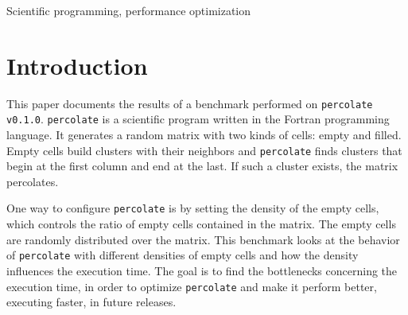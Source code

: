 \documentclass[twoside,11pt]{article}
\title{\titl}
\author{}
\def\perc{\texttt{perco\-late}}
\def\v{\texttt{v0.1.0}}
\begin{document}
\maketitle

\begin{abstract}
  \perc{} \v{} is a scientific program.
  It generates a random matrix with two kinds of cells:
  empty and filled.
  Empty cells build clusters with their neighbors and
  \perc{} finds clusters that begin at the first column and
  end at the last.
  If such a cluster exists, the matrix percolates.

  The benchmark of \perc{}---presented in this
  paper---looks at how the program scales with different
  densities of filled cells.
  The goal of this benchmark is to find bottlenecks of
  the execution time, in order to optimize \perc{} in
  future releases.

  The benchmark was executed on the Cirrus supercomputer
  with exclusive access to one back end node.
  The results of the benchmark show extreme and unresolved
  scaling behavior over the different densities of empty
  cells, but successfully exposes the bottleneck.

  This paper discusses the results of the benchmark and
  gives an outline for optimizing \perc{} in future
  releases.
  Also ideas for a follow-up benchmark shining light onto
  unresolved questions concerning the scaling behavior of
  \perc{} over different densities of filled cells---raised
  by this paper---are given.
\end{abstract}

\begin{keywords}
Scientific programming, performance optimization
\end{keywords}

\section{Introduction} %

This paper documents the results of a benchmark performed
on \perc{} \v{}.
\perc{} is a scientific program written in the
Fortran programming language. It generates a random matrix
with two kinds of cells: empty and filled.
Empty cells build clusters with their neighbors and
\perc{} finds clusters that begin at the first column and
end at the last.
If such a cluster exists, the matrix percolates.

One way to configure \perc{} is by setting the density of
the empty cells, which controls the ratio of empty cells
contained in the matrix.
The empty cells are randomly distributed over the matrix.
This benchmark looks at the behavior of \perc{} with
different densities of empty cells and how the density
influences the execution time.
The goal is to find the bottlenecks concerning the
execution time, in order to optimize \perc{} and make it
perform better, executing faster, in future releases.
\end{document}
